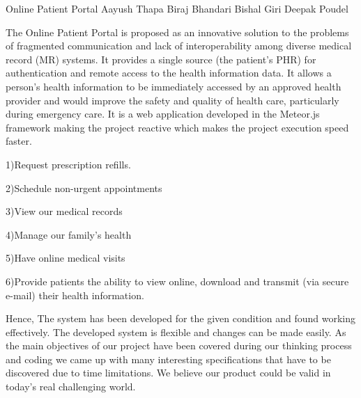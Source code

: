  \begin{conf-abstract}[]
 {Online Patient Portal }
 {Aayush Thapa
 	Biraj Bhandari
 	Bishal Giri
 	Deepak Poudel
 }
{}

The Online Patient Portal is proposed as an innovative solution to the problems of fragmented communication and lack of interoperability among diverse medical record (MR) systems. It provides a single source (the patient’s PHR) for authentication and remote access to the health information data. It allows a person’s health information to be immediately accessed by an approved health provider and would improve the safety and quality of health care, particularly during emergency care. It is a web application developed in the Meteor.js framework making the project reactive which makes the project execution speed faster.

1)Request prescription refills.

2)Schedule non-urgent appointments

3)View our medical records

4)Manage our family's health

5)Have online medical visits

6)Provide patients the ability to view online, download and transmit (via
secure e-mail) their health information.

Hence, The system has been developed for the given condition and found working effectively. The developed system is flexible and changes can be made easily. As the main objectives of our project have been covered during our thinking process and coding we came up with many interesting specifications that have to be discovered due to time limitations. We believe our product could be valid in today's real challenging world. 

 \end{conf-abstract}
